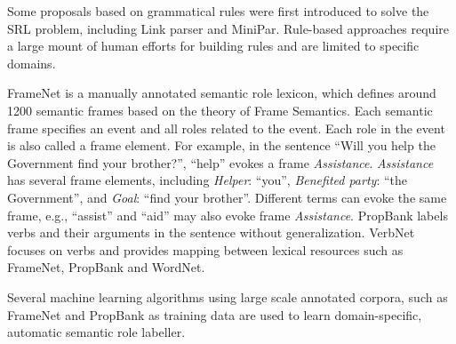 Some proposals based on grammatical rules were first introduced to solve
the SRL problem, including Link parser\cite{sleator1995parsing} and
MiniPar\cite{lin1994principar}. Rule-based approaches require
a large mount of human efforts for building rules and are limited to specific domains.

FrameNet is a manually annotated semantic role lexicon,
which defines around 1200 semantic frames based on
the theory of Frame Semantics. Each semantic frame specifies an event
and all roles related to the event. Each role in the event
is also called a frame element.
For example, in the sentence ``Will you help the Government
find your brother?'',
``help'' evokes a frame {\em Assistance}.
{\em Assistance} has several frame elements,
including {\em Helper}: ``you'', {\em Benefited party}:
``the Government'', and {\em Goal}: ``find your brother''.
Different terms can evoke the same frame, e.g., ``assist''
and ``aid'' may also evoke frame {\em Assistance}.
PropBank labels verbs and their arguments
in the sentence without generalization.
VerbNet\cite{KipperDP00} focuses on verbs and provides mapping
between lexical resources such as FrameNet, PropBank and WordNet.

Several machine learning algorithms\cite{gildea2002automatic,pradhan2004shallow,pradhan2005semantic,
marquez2008semantic}
using large scale annotated
corpora, such as FrameNet\cite{baker1998berkeley}
and PropBank\cite{kingsbury2002treebank} as training data
are used to learn domain-specific, automatic semantic role labeller.

